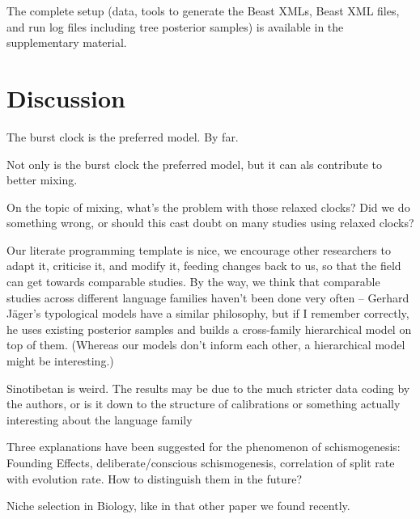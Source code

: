 \documentclass[a4paper,12pt]{scrartcl}
\begin{document}
The complete setup (data, tools to generate the Beast XMLs, Beast XML files, and
run log files including tree posterior samples) is available in the
supplementary material.

\section{Discussion}
The burst clock is the preferred model. By far.

Not only is the burst clock the preferred model, but it can als contribute to
better mixing.

On the topic of mixing, what's the problem with those relaxed clocks? Did we do
something wrong, or should this cast doubt on many studies using relaxed clocks?

Our literate programming template is nice, we encourage other researchers to
adapt it, criticise it, and modify it, feeding changes back to us, so that the
field can get towards comparable studies. By the way, we think that comparable
studies across different language families haven't been done very often –
Gerhard Jäger's typological models have a similar philosophy, but if I remember
correctly, he uses existing posterior samples and builds a cross-family
hierarchical model on top of them. (Whereas our models don't inform each other,
a hierarchical model might be interesting.)

Sinotibetan is weird. The results may be due to the much stricter data coding by
the authors, or is it down to the structure of calibrations or something
actually interesting about the language family

Three explanations have been suggested for the phenomenon of schismogenesis:
Founding Effects, deliberate/conscious schismogenesis,
correlation of split rate with evolution rate. How
to distinguish them in the future?

Niche selection in Biology, like in that other paper we found recently.

\printbibliography{}
\end{document}
